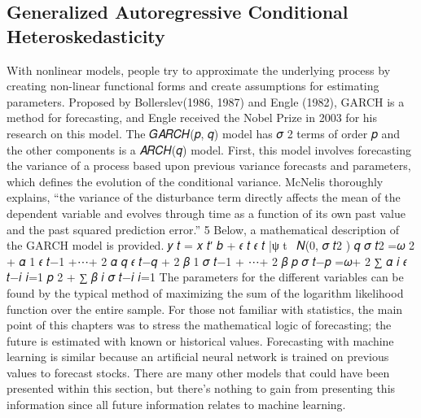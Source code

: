 \documentclass[../main.tex]{subfiles}
\begin{document}
    \subsection{Generalized Autoregressive Conditional Heteroskedasticity}\label{subsec:generalized-autoregressive-conditional-heteroskedasticity}
    With nonlinear models, people try to approximate the underlying process by creating non-linear functional forms and create assumptions for estimating parameters.
    Proposed by Bollerslev(1986, 1987) and Engle (1982), GARCH is a method for forecasting, and Engle received the Nobel Prize in 2003 for his research on this model. %
    The 𝐺𝐴𝑅𝐶𝐻(𝑝, 𝑞) model has 𝜎 2 terms of order 𝑝 and the other components is a 𝐴𝑅𝐶𝐻(𝑞) model.
    First, this model involves forecasting the variance of a process based upon previous variance forecasts and parameters, which defines the evolution of the conditional variance.
    McNelis thoroughly explains, “the variance of the disturbance term directly affects the mean of the dependent variable and evolves through time as a function of its own past value and the past squared prediction error.” 5 Below, a mathematical description of the GARCH model is provided.
    𝑦 𝑡 = 𝑥 𝑡′ 𝑏 + 𝜖 𝑡
    𝜖 𝑡 |ψ t ~𝑁(0, 𝜎 𝑡2 )
    𝑞
    𝜎 𝑡2
    =𝜔
    2
    + 𝛼 1 𝜖 𝑡−1
    +⋯+
    2
    𝛼 𝑞 𝜖 𝑡−𝑞
    +
    2
    𝛽 1 𝜎 𝑡−1
    + ⋯+
    2
    𝛽 𝑝 𝜎 𝑡−𝑝
    =𝜔+
    2
    ∑ 𝛼 𝑖 𝜖 𝑡−𝑖
    𝑖=1
    𝑝
    2
    + ∑ 𝛽 𝑖 𝜎 𝑡−𝑖
    𝑖=1
    The parameters for the different variables can be found by the typical method of maximizing the sum of the logarithm likelihood function over the entire sample.
    For those not familiar with statistics, the main point of this chapters was to stress the mathematical logic of forecasting; the future is estimated with known or historical values.
    Forecasting with machine learning is similar because an artificial neural network is trained on previous values to forecast stocks.
    There are many other models that could have been presented within this section, but there’s nothing to gain from presenting this information since all future information relates to machine learning.
\end{document}
